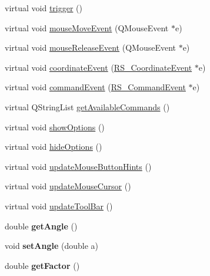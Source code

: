 \begin{DoxyCompactItemize}
\item 
virtual void \hyperlink{classRS__ActionBlocksInsert_a63797c853cfc6266d3defe4688002dad}{trigger} ()
\item 
virtual void \hyperlink{classRS__ActionBlocksInsert_a3c23e3aa65103bfb6c7837f32bdb35fd}{mouse\-Move\-Event} (Q\-Mouse\-Event $\ast$e)
\item 
virtual void \hyperlink{classRS__ActionBlocksInsert_abbecdc07cdf9e89cf4315811715f0a24}{mouse\-Release\-Event} (Q\-Mouse\-Event $\ast$e)
\item 
virtual void \hyperlink{classRS__ActionBlocksInsert_a18dd89c17accfbbc0f5baf9987f59bd9}{coordinate\-Event} (\hyperlink{classRS__CoordinateEvent}{R\-S\-\_\-\-Coordinate\-Event} $\ast$e)
\item 
virtual void \hyperlink{classRS__ActionBlocksInsert_a87c2b21582f52ddc683e101d85648815}{command\-Event} (\hyperlink{classRS__CommandEvent}{R\-S\-\_\-\-Command\-Event} $\ast$e)
\item 
virtual Q\-String\-List \hyperlink{classRS__ActionBlocksInsert_a6316c84ccd449fe541ffcfffa0fcc139}{get\-Available\-Commands} ()
\item 
virtual void \hyperlink{classRS__ActionBlocksInsert_a0574cac7910a4f377de60a3b672cc84c}{show\-Options} ()
\item 
virtual void \hyperlink{classRS__ActionBlocksInsert_a42e9044b5601395223cd93467133b243}{hide\-Options} ()
\item 
virtual void \hyperlink{classRS__ActionBlocksInsert_ab42dd5b53327f9cb3a26b1f59f4b745c}{update\-Mouse\-Button\-Hints} ()
\item 
virtual void \hyperlink{classRS__ActionBlocksInsert_a05e81acf2d01ea24c82fc5c795c8e391}{update\-Mouse\-Cursor} ()
\item 
virtual void \hyperlink{classRS__ActionBlocksInsert_a62e2e80458d5958b329af3d8d8871537}{update\-Tool\-Bar} ()
\item 
\hypertarget{classRS__ActionBlocksInsert_a53881535b66c66e2ca5fc404e4649e06}{double {\bfseries get\-Angle} ()}\label{classRS__ActionBlocksInsert_a53881535b66c66e2ca5fc404e4649e06}

\item 
\hypertarget{classRS__ActionBlocksInsert_af2f9661edaf0d6e1dcf6f0ebb30215fb}{void {\bfseries set\-Angle} (double a)}\label{classRS__ActionBlocksInsert_af2f9661edaf0d6e1dcf6f0ebb30215fb}

\item 
\hypertarget{classRS__ActionBlocksInsert_ab2f016ad21f89169e399d32ed5be8073}{double {\bfseries get\-Factor} ()}\label{classRS__ActionBlocksInsert_ab2f016ad21f89169e399d32ed5be8073}


\end{DoxyCompactItemize}

